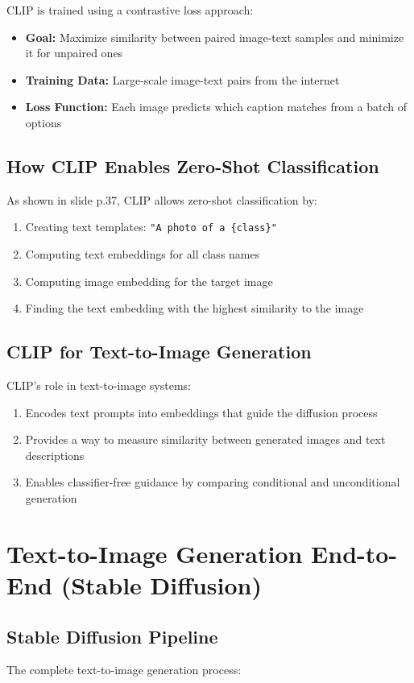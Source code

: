 CLIP is trained using a contrastive loss approach:
\begin{itemize}
    \item \textbf{Goal:} Maximize similarity between paired image-text samples and minimize it for unpaired ones
    \item \textbf{Training Data:} Large-scale image-text pairs from the internet
    \item \textbf{Loss Function:} Each image predicts which caption matches from a batch of options
\end{itemize}

\subsection*{How CLIP Enables Zero-Shot Classification}
As shown in slide p.37, CLIP allows zero-shot classification by:
\begin{enumerate}
    \item Creating text templates: \texttt{"A photo of a \{class\}"}
    \item Computing text embeddings for all class names
    \item Computing image embedding for the target image
    \item Finding the text embedding with the highest similarity to the image
\end{enumerate}

\subsection*{CLIP for Text-to-Image Generation}
CLIP’s role in text-to-image systems:
\begin{enumerate}
    \item Encodes text prompts into embeddings that guide the diffusion process
    \item Provides a way to measure similarity between generated images and text descriptions
    \item Enables classifier-free guidance by comparing conditional and unconditional generation
\end{enumerate}
\section{Text-to-Image Generation End-to-End (Stable Diffusion)}

\subsection*{Stable Diffusion Pipeline}
The complete text-to-image generation process:

